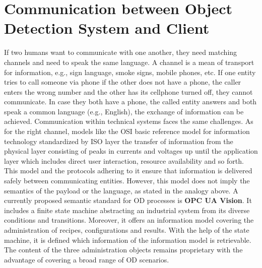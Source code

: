 \section{Communication between Object Detection System and Client}
If two humans want to communicate with one another, they need matching channels and need to speak the same language. A channel is a mean of transport for information, e.g., sign language, smoke signs, mobile phones, etc. If one entity tries to call someone via phone if the other does not have a phone, the caller enters the wrong number and the other has its cellphone turned off, they cannot communicate. In case they both have a phone, the called entity answers and both speak a common language (e.g., English), the exchange of information can be achieved. Communication within technical systems faces the same challenges. As for the right channel, models like the OSI basic reference model for information technology standardized by ISO layer the transfer of information from the physical layer consisting of peaks in currents and voltages up until the application layer which includes direct user interaction, resource availability and so forth.~\cite{InternationalOrganizationForStandardization1996ISO/IECEd.} This model and the protocols adhering to it ensure that information is delivered safely between communicating entities. However, this model does not imply the semantics of the payload or the language, as stated in the analogy above. A currently proposed semantic standard for OD processes is \textbf{OPC UA Vision}. It includes a finite state machine abstracting an industrial system from its diverse conditions and transitions. Moreover, it offers an information model covering the administration of recipes, configurations and results. With the help of the state machine, it is defined which information of the information model is retrievable. The content of the three administration objects remains proprietary with the advantage of covering a broad range of OD scenarios.


